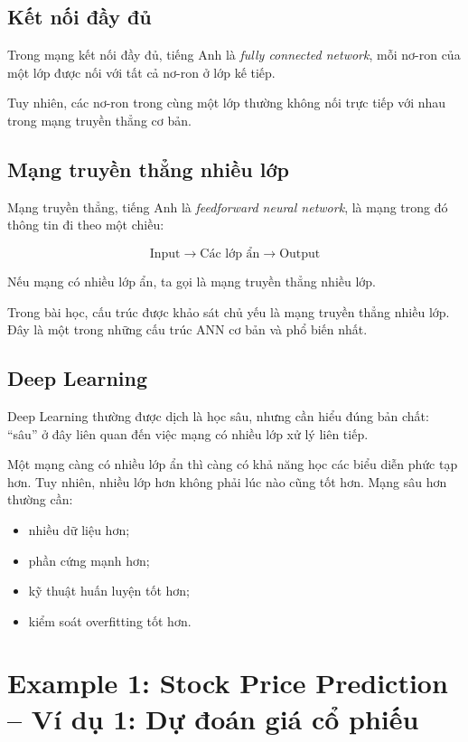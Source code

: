 \subsection{Kết nối đầy đủ}

Trong mạng kết nối đầy đủ, tiếng Anh là \textit{fully connected network}, mỗi nơ-ron của một lớp được nối với tất cả nơ-ron ở lớp kế tiếp.

Tuy nhiên, các nơ-ron trong cùng một lớp thường không nối trực tiếp với nhau trong mạng truyền thẳng cơ bản.

\subsection{Mạng truyền thẳng nhiều lớp}

Mạng truyền thẳng, tiếng Anh là \textit{feedforward neural network}, là mạng trong đó thông tin đi theo một chiều:

\[
    \text{Input} \rightarrow \text{Các lớp ẩn} \rightarrow \text{Output}
\]

Nếu mạng có nhiều lớp ẩn, ta gọi là mạng truyền thẳng nhiều lớp.

\begin{ghinho}
Trong bài học, cấu trúc được khảo sát chủ yếu là mạng truyền thẳng nhiều lớp. Đây là một trong những cấu trúc ANN cơ bản và phổ biến nhất.
\end{ghinho}

\subsection{Deep Learning}

Deep Learning thường được dịch là học sâu, nhưng cần hiểu đúng bản chất: ``sâu'' ở đây liên quan đến việc mạng có nhiều lớp xử lý liên tiếp.

Một mạng càng có nhiều lớp ẩn thì càng có khả năng học các biểu diễn phức tạp hơn. Tuy nhiên, nhiều lớp hơn không phải lúc nào cũng tốt hơn. Mạng sâu hơn thường cần:

\begin{itemize}
    \item nhiều dữ liệu hơn;
    \item phần cứng mạnh hơn;
    \item kỹ thuật huấn luyện tốt hơn;
    \item kiểm soát overfitting tốt hơn.
\end{itemize}

\section{Example 1: Stock Price Prediction -- Ví dụ 1: Dự đoán giá cổ phiếu}

